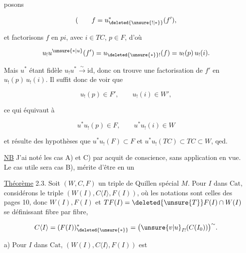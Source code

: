  posons

\[
(\qquad f=u_{\deleted{\unsure{!|*}}}^{*}(f'),
\]

et factorisons $f$ en $pi$, avec $i\in TC$, $p\in F$,
d'où

\[
u_!u^{\unsure{*|u}}(f')=u_{\deleted{\unsure{*}}!}(f)=u_!(p)\,u_!(i).
\]

Mais $u^*$ étant  fidèle $u_!u^*\xrightarrow{\sim}\mathrm{id}$, donc
on trouve une factorisation de 
$f'$ en $u_!(p)\,u_!(i)$.  Il suffit
donc de voir que

\[
u_!(p)\in F',\qquad u_!(i)\in W',
\]

ce qui équivaut à

\[
u^*u_!(p)\in F,\qquad u^*u_!(i)\in W
\]

et résulte des hypothèses  que $u^*u_!(F)\subset F$
et $u^*u_!(TC)\subset TC\subset W$, qed.

\uline{NB} J'ai noté les cas A) et C) par acquit de
conscience, sans application  en vue. Le cas
 utile sera  cas B),  mérite d'être
 en un

\uline{Théorème} 2.3. Soit $(W,C,F)$ un triple de Quillen
spécial  $M$. Pour  $I$ dans $\mathrm{Cat}$, considérons
le triple $(W(I),C\langle I\rangle,F(I))$, où les notations
sont celles des pages 10, donc $W(I),F(I)$ et
$TF(I)=\deleted{\unsure{T}}F(I)\cap W(I)$ se définissant fibre par fibre,

\[
C\langle I\rangle=(F(I))_{\deleted{\unsure{*}}}^{*}=\big(\unsure{v|u}_{I!}(C(I_0))\big)^{\sim}.
\]

a) Pour  $I$ dans $\mathrm{Cat}$, $(W(I),C\langle I\rangle,F(I))$ est
